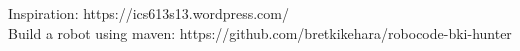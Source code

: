 \documentclass{scrreprt}
\begin{document}
Inspiration: https://ics613s13.wordpress.com/\\
Build a robot using maven: https://github.com/bretkikehara/robocode-bki-hunter

%
%
%
%
\end{document}
